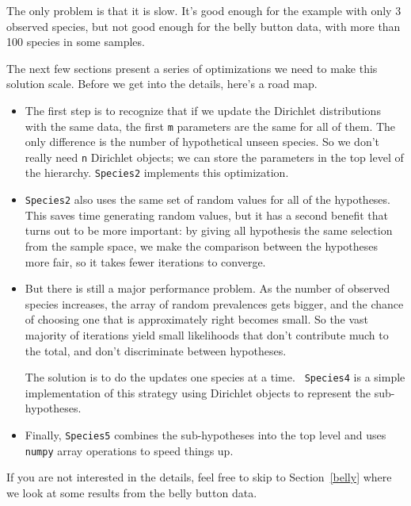 \documentclass[12pt]{book}
\begin{document}
The only problem is that it is slow.  It's good enough for the example
with only 3 observed species, but not good enough for the belly button
data, with more than 100 species in some samples.

The next few sections present a series of optimizations we need to
make this solution scale.  Before we get into the details, here's
a road map.

\begin{itemize}

\item The first step is to recognize that if we update the Dirichlet
  distributions with the same data, the first {\tt m} parameters are
  the same for all of them.  The only difference is the number of
  hypothetical unseen species.  So we don't really need {\tt n}
  Dirichlet objects; we can store the parameters in the top level of
  the hierarchy.  {\tt Species2} implements this optimization.

\item {\tt Species2} also uses the same set of random values for all
  of the hypotheses.  This saves time generating random values, but it
  has a second benefit that turns out to be more important: by giving
  all hypothesis the same selection from the sample space, we make
  the comparison between the hypotheses more fair, so it takes
  fewer iterations to converge.

\item But there is still a major performance problem.  As the
  number of observed species increases, the array of random
  prevalences gets bigger, and the chance of choosing one that is
  approximately right becomes small.  So the vast majority
  of iterations yield small likelihoods that don't contribute
  much to the total, and don't discriminate between hypotheses.

  The solution is to do the updates one species at a time.  {\tt
  Species4} is a simple implementation of this strategy using
  Dirichlet objects to represent the sub-hypotheses.

\item Finally, {\tt Species5} combines the sub-hypotheses into the top
  level and uses {\tt numpy} array operations to speed things up.

\end{itemize}

If you are not interested in the details, feel free to skip to
Section~\ref{belly} where we look at some results from the belly
button data.
\end{document}
